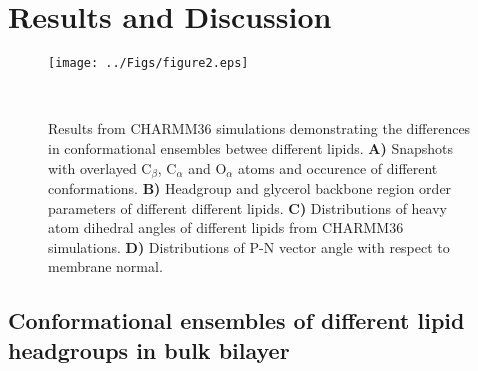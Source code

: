\documentclass[aps,prl,superscriptaddress,twocolumn]{revtex4}
\begin{document}
\section{Results and Discussion}


\begin{figure*}[]
  \centering
   \texttt{[image: ../Figs/figure2.eps]}
   \caption{\label{structures}
     Results from CHARMM36 simulations demonstrating the differences in conformational ensembles betwee different lipids. 
     {\bf A)} Snapshots with overlayed C$_\beta$, C$_\alpha$ and O$_\alpha$ atoms and occurence of different conformations.
     {\bf B)} Headgroup and glycerol backbone region order parameters of different different lipids.
     {\bf C)} Distributions of heavy atom dihedral angles of different lipids from CHARMM36 simulations.
     {\bf D)} Distributions of P-N vector angle with respect to membrane normal.
  }
   \\
\end{figure*}


\subsection{Conformational ensembles of different lipid headgroups in bulk bilayer}
\end{document}
